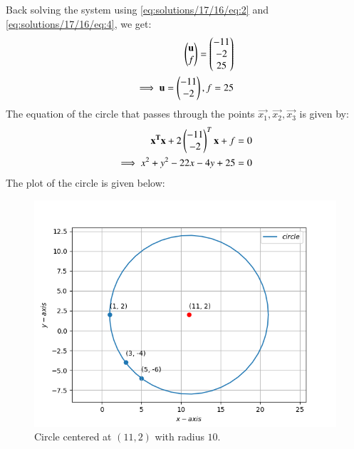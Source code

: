 Back solving the system using \eqref{eq:solutions/17/16/eq:2} and \eqref{eq:solutions/17/16/eq:4}, we get:
\begin{align}
\begin{pmatrix}\mathbf{u}\\f\end{pmatrix}=\begin{pmatrix}-11 \\ -2 \\ 25\end{pmatrix} \\
\implies \mathbf{u} = \begin{pmatrix}-11 \\ -2\end{pmatrix}, f = 25
\end{align}
The equation of the circle that passes through the points $\vec{x_1}, \vec{x_2}, \vec{x_3}$ is given by:
\begin{align}
\mathbf{x^Tx}+2\begin{pmatrix}-11 \\ -2\end{pmatrix}^T\mathbf{x}+f = 0 \\
\implies x^2 + y^2 - 22x -4y + 25 = 0
\end{align}
The plot of the circle is given below:
\begin{figure}[t]
\centering
    \includegraphics[width=\columnwidth]{solutions/17/16/Latex/Figure_1.png}
    \caption{Circle centered at $(11, 2)$ with radius $10$.}
    \label{eq:solutions/17/16/fig:1}
\end{figure}

